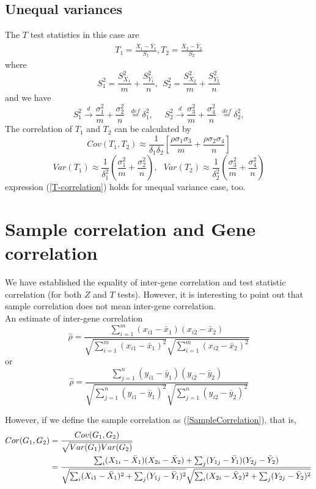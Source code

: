\documentclass[12pt,oneside]{book}
\begin{document}
\subsection*{Unequal variances}
The $T$ test statistics in this case are 
\begin{align*}\label{ttest-unequal}
 T_1 = \frac{\bar{X}_1 - \bar{Y}_1}{S_1},  T_2 = \frac{\bar{X}_2-\bar{Y}_2}{S_2}
\end{align*}
where 
\[S_1^2 = \frac{S_{X_1}^2}{m} + \frac{S_{Y_1}^2}{n}, ~~ S_2^2 = \frac{S_{X_2}^2}{m} + \frac{S_{Y_2}^2}{n}\]
and we have 
\[    S_1^2  \stackrel {d}{ \rightarrow} \frac{\sigma_1^2}{m} + \frac{\sigma_2^2}{n}~~ \stackrel{def}{=}\delta_1^2,  ~~~~~~  S_2^2  \stackrel {d}{ \rightarrow} \frac{\sigma_3^2}{m} + \frac{\sigma_4^2}{n}~~ \stackrel{def}{=}\delta_2^2, \]
The correlation of $T_1$ and $T_2$ can be calculated by 
\[Cov(T_1, T_2) \approx \frac{1}{\delta_1\delta_2}\left[\frac{\rho\sigma_1\sigma_3 }{m} + \frac{\rho \sigma_2 \sigma_4}{n}\right]\]
\[Var(T_1)  \approx\frac{1}{\delta_1^2}(\frac{\sigma_1^2}{m} + \frac{\sigma_2^2}{n}) , ~~~Var(T_2)  \approx\frac{1}{\delta_2^2}(\frac{\sigma_3^2}{m} + \frac{\sigma_4^2}{n}) \]
expression (\ref{T-correlation}) holds for unequal variance case, too. 
\section*{Sample correlation and Gene correlation}
We have established the equality of inter-gene correlation and test statistic correlation (for both $Z$ and $T$ tests). However, it is interesting to point out that sample correlation does not mean inter-gene correlation. \\

An estimate of inter-gene correlation
\[\hat{\rho} = \frac{\sum_{i=1}^m (x_{i1}-\bar{x}_1)(x_{i2} -\bar{x}_2)}{\sqrt{\sum_{i=1}^m(x_{i1}-\bar{x}_1)^2}\sqrt{\sum_{i=1}^m(x_{i2}-\bar{x}_2)^2}}\]
or 
\[\hat{\rho} = \frac{\sum_{j=1}^n(y_{i1}-\bar{y}_1)(y_{i2} -\bar{y}_2)}{\sqrt{\sum_{j=1}^n(y_{i1}-\bar{y}_1)^2}\sqrt{\sum_{j=1}^n(y_{i2}-\bar{y}_2)^2}}\]

However, if we define the sample correlation as (\ref{SampleCorrelation}),  that is, 
\begin{align} \notag
Cor(G_1, G_2) &= \frac{Cov(G_1, G_2)}{\sqrt{Var(G_1)Var(G_2)}} \\ 
&= \frac{\sum_i(X_{1i} - \bar{X}_1)(X_{2i} -\bar{X}_2) + \sum_j(Y_{1j}-\bar{Y}_1)(Y_{2j}-\bar{Y}_2)}{\sqrt{\sum_i(X_{i1}-\bar{X}_1)^2+ \sum_j(Y_{1j}-\bar{Y}_1)^2}\sqrt{\sum_i(X_{2i}-\bar{X}_2)^2 + \sum_j(Y_{2j}-\bar{Y}_2)^2}} \notag
\end{align}
\end{document}
